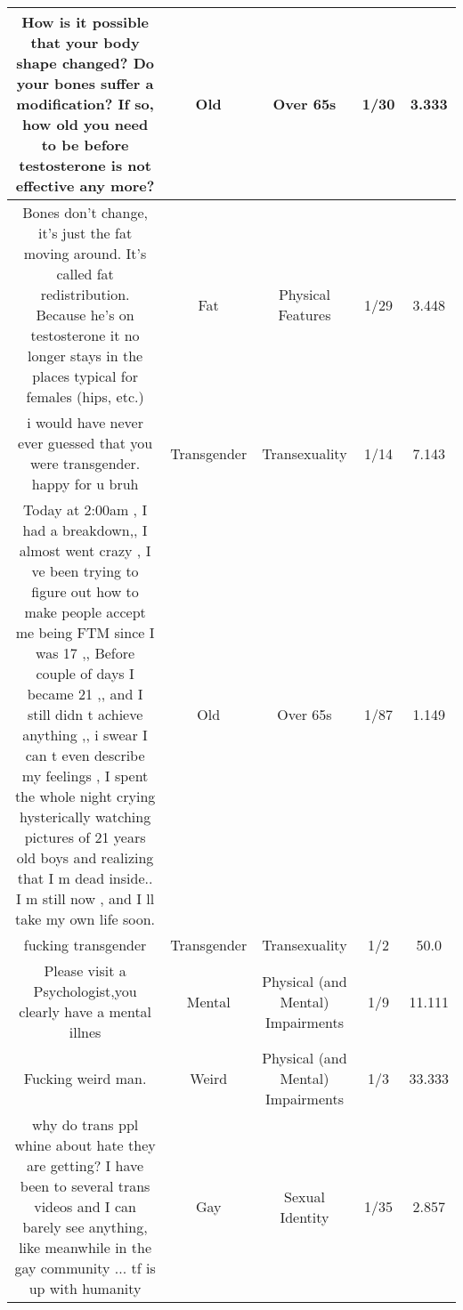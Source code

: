 \documentclass[11pt]{article}
\newlength\mylength
\begin{document}
\begin{center}
\begin{longtable}{|C{.40\mylength}|C{.30\mylength}|C{.15\mylength}|C{.15\mylength}|C{.15\mylength}|}
  How is it possible that your body shape changed? Do your bones suffer a modification? If so, how old you need to be before testosterone is not effective any more?  & Old & Over 65s & 1/30 & 3.333 \\  \hline
  Bones don't change, it's just the fat moving around. It's called fat redistribution. Because he's on testosterone it no longer stays in the places typical for females (hips, etc.)  & Fat & Physical Features & 1/29 & 3.448 \\  \hline
  i would have never ever guessed that you were transgender. happy for u bruh  & Transgender & Transexuality & 1/14 & 7.143 \\  \hline
  Today at 2:00am , I had a breakdown,, I almost went crazy , I ve been trying to figure out how to make people accept me being FTM since I was 17 ,,  Before couple of days I became 21 ,, and I still didn t achieve anything ,, i swear I can t even describe my feelings , I spent the whole night crying hysterically watching pictures of 21 years old boys and realizing that I m dead inside..  I m still now , and I ll take my own life soon.  & Old & Over 65s & 1/87 & 1.149 \\  \hline
  fucking transgender  & Transgender & Transexuality & 1/2 & 50.0 \\  \hline
  Please visit a Psychologist,you clearly have a mental illnes  & Mental & Physical (and Mental) Impairments & 1/9 & 11.111 \\  \hline
  Fucking weird man.  & Weird & Physical (and Mental) Impairments & 1/3 & 33.333 \\  \hline
  why do trans ppl whine about hate they are getting? I have been to several trans videos and I can barely see anything, like meanwhile in the gay community ... tf is up with humanity  & Gay & Sexual Identity & 1/35 & 2.857 \\  \hline

\end{longtable}
\end{center}
\end{document}
